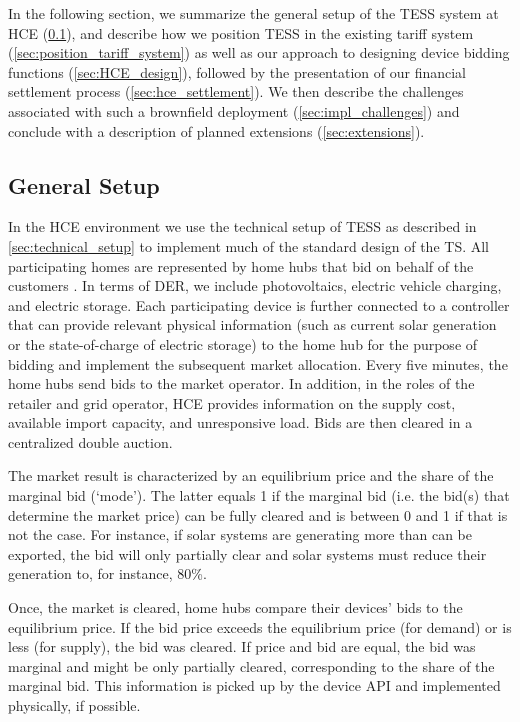 \documentclass[12pt]{article}{Definitions/mdpi}
\begin{document}
In the following section, we summarize the general setup of the TESS system at HCE (\cref{sec:hce_market_setup}), and describe how we position TESS in the existing tariff system (\cref{sec:position_tariff_system}) as well as our approach to designing device bidding functions (\cref{sec:HCE_design}), followed by the presentation of our financial settlement process (\cref{sec:hce_settlement}). We then describe the challenges associated with such a brownfield deployment (\cref{sec:impl_challenges}) and conclude with a description of planned extensions (\cref{sec:extensions}).

\subsection{General Setup}\label{sec:hce_market_setup}

In the HCE environment we use the technical setup of TESS as described in \cref{sec:technical_setup} to implement much of the standard design of the TS. All participating homes are represented by home hubs that bid on behalf of the customers \citep{powernet2021}. In terms of DER, we include photovoltaics, electric vehicle charging, and electric storage. Each participating device is further connected to a controller that can provide relevant physical information (such as current solar generation or the state-of-charge of electric storage) to the home hub for the purpose of bidding and implement the subsequent market allocation. Every five minutes, the home hubs send bids to the market operator. In addition, in the roles of the retailer and grid operator, HCE provides information on the supply cost, available import capacity, and unresponsive load. Bids are then cleared in a centralized double auction. 

The market result is characterized by an equilibrium price and the share of the marginal bid (`mode'). The latter equals 1 if the marginal bid (i.e. the bid(s) that determine the market price) can be fully cleared and is between 0 and 1 if that is not the case. For instance, if solar systems are generating more than can be exported, the bid will only partially clear and solar systems must reduce their generation to, for instance, 80\%.

Once, the market is cleared, home hubs compare their devices' bids to the equilibrium price. If the bid price exceeds the equilibrium price (for demand) or is less (for supply), the bid was cleared. 
If price and bid are equal, the bid was marginal and might be only partially cleared, corresponding to the share of the marginal bid.
This information is picked up by the device API and implemented physically, if possible.
\end{document}
